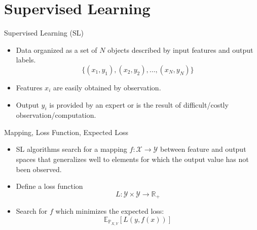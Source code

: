 \section{Supervised Learning}

\begin{frame}{Supervised Learning (SL)}
  \begin{itemize}
    \item Data organized as a set of $N$ objects described by input features and output labels.
    $$\{(x_1, y_1), (x_2, y_2), \dots, (x_N, y_N)\} $$
    \item Features $x_i$ are easily obtained by observation.
    \item Output $y_i$ is provided by an expert or is the result of difficult/costly observation/computation.
  \end{itemize}
\end{frame}

\begin{frame}{Mapping, Loss Function, Expected Loss}
  \begin{itemize}
    \item SL algorithms search for a mapping $f : \mathcal{X} \rightarrow \mathcal{Y}$ between feature and output spaces that generalizes well to elements for which the output value has not been observed.
    \item Define a loss function $$ L: \mathcal{Y} \times \mathcal{Y}  \rightarrow \mathbb{R}_+$$
    \item Search for $f$ which minimizes the expected loss:
      \[ \mathbb{E}_{\mathbb{P}_{X,Y}}[L(y, f(x))] \]
  \end{itemize}
\end{frame}

